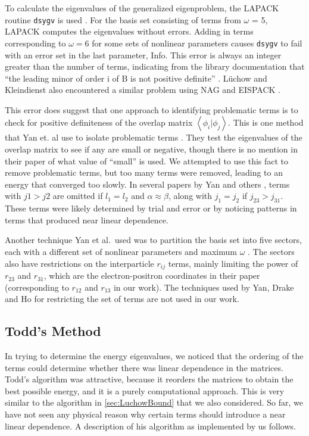 \documentclass[Dissertation.tex]{subfiles}
\begin{document}
To calculate the eigenvalues of the generalized eigenproblem, the LAPACK 
routine \texttt{dsygv} is used \cite{dsygv}. For the basis set consisting of 
terms from $\omega$ = 5, LAPACK computes the eigenvalues without errors. 
Adding in terms corresponding to $\omega = 6$ for some sets of nonlinear 
parameters causes \texttt{dsygv} to fail with an error set in the last 
parameter, Info. This error is always an integer greater than the number of 
terms, indicating from the library documentation that ``the leading minor of 
order i of B is not positive definite'' \cite{dsygv}. L\"uchow and 
Kleindienst also encountered a similar problem using NAG and EISPACK
\cite{Luchow1993}.

This error does suggest that one approach to identifying problematic terms is 
to check for positive definiteness of the overlap matrix
$\left\langle \phi_i | \phi_j \right\rangle$. This is one method that
Yan et. al use to isolate 
problematic terms \cite{Yan1999}. They test the eigenvalues of the overlap 
matrix to see if any are small or negative, though there is no mention in 
their paper of what value of ``small'' is used. We attempted to use this fact 
to remove problematic terms, but too many terms were removed, leading to an 
energy that converged too slowly. In several papers by Yan and others
\cite{Yan1998,Yan1998a,Yan1999,Drake1995,Yan1997a}, terms with $j1 > j2$ are 
omitted if $l_1 = l_2$ and $\alpha \approx \beta$, along with $j_1 = j_2$ if
$j_{23} > j_{31}$. These terms were likely determined by trial and error 
or by noticing patterns in terms that produced near linear dependence.

Another technique Yan et al.\ used was to partition the basis set into five 
sectors, each with a different set of nonlinear parameters and maximum
$\omega$ \cite{Yan1999}. The sectors also have restrictions on the interparticle
$r_{ij}$ terms, mainly limiting the power of $r_{23}$ and $r_{31}$, which are the 
electron-positron coordinates in their paper (corresponding to $r_{12}$ and
$r_{13}$ in our work). The techniques used by Yan, Drake and Ho for restricting 
the set of terms are not used in our work.


\subsection{Todd's Method}
\label{sec:ToddBound}

In trying to determine the energy eigenvalues, we noticed that the ordering 
of the terms could determine whether there was linear dependence in the 
matrices. Todd's algorithm \cite{Todd2007,Armour2008} was attractive,
because it reorders the matrices to obtain the best possible energy, and it 
is a purely computational approach. This is very similar to the algorithm
in \cref{sec:LuchowBound} that we also considered. So far, we have not seen 
any physical reason why certain terms should introduce a near linear 
dependence. A description of his algorithm as implemented by us follows.
\end{document}
